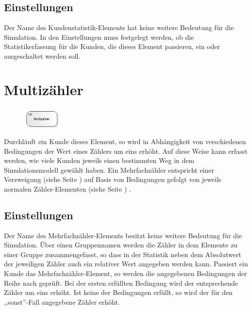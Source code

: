 \subsection*{Einstellungen}

Der Name des Kundenstatistik-Elements hat keine weitere Bedeutung für die Simulation.
In den Einstellungen muss festgelegt werden, ob die Statistikerfassung für die Kunden,
die dieses Element passieren, ein oder ausgeschaltet werden soll.


\section{Multizähler}
\label{ref:ModelElementCounterMulti}

\begin{figure}
\vspace{-22pt}
\includegraphics[width=2cm]{imageModelElementCounterMulti.png}
\vspace{-22pt}
\end{figure}

Durchläuft ein Kunde dieses Element, so wird in Abhängigkeit von verschiedenen Bedingungen
der Wert eines Zählers um eins erhöht. Auf diese Weise kann erfasst werden, wie viele Kunden
jeweils einen bestimmten Weg in dem Simulationsmodell gewählt haben. Ein Mehrfachzähler
entspricht einer Verzweigung (siehe Seite \pageref{ref:ModelElementDecide}) auf Basis von Bedingungen
gefolgt von jeweils normalen Zähler-Elementen (siehe Seite \pageref{ref:ModelElementCounter}) .

\subsection*{Einstellungen}

Der Name des Mehrfachzähler-Elements besitzt keine weitere Bedeutung für die Simulation.
Über einen Gruppennamen werden die Zähler in dem Elemente zu einer Gruppe zusammengefasst,
so dass in der Statistik neben dem Absolutwert der jeweiligen Zähler auch ein relativer
Wert angegeben werden kann. Passiert ein Kunde das Mehrfachzähler-Element, so werden die
angegebenen Bedingungen der Reihe nach geprüft. Bei der ersten erfüllten Bedingung wird
der entsprechende Zähler um eins erhöht. Ist keine der Bedingungen erfüllt, so wird der
für den ,,sonst''-Fall angegebene Zähler erhöht. 


